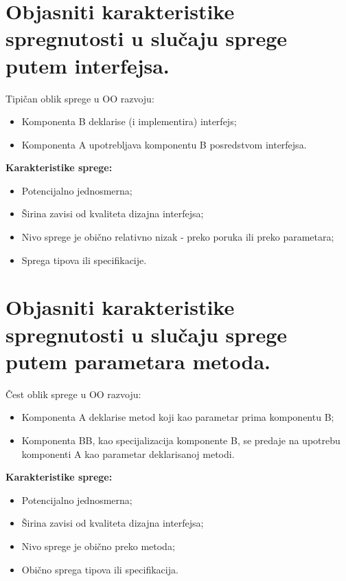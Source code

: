 \documentclass[a4paper]{article}
\begin{document}
\section{Objasniti karakteristike spregnutosti u slučaju sprege putem interfejsa.}
  \noindent Tipičan oblik sprege u OO razvoju:
  \begin{itemize}
    \item Komponenta B deklarise (i implementira) interfejs;
    \item Komponenta A upotrebljava komponentu B posredstvom interfejsa.
  \end{itemize}
  \textbf{Karakteristike sprege:}
  \begin{itemize}
    \item Potencijalno jednosmerna;
    \item Širina zavisi od kvaliteta dizajna interfejsa;
    \item Nivo sprege je obično relativno nizak - preko poruka ili preko parametara;
    \item Sprega tipova ili specifikacije.
  \end{itemize}

\section{Objasniti karakteristike spregnutosti u slučaju sprege putem parametara metoda.}
  \noindent Čest oblik sprege u OO razvoju:
  \begin{itemize}
    \item Komponenta A deklarise metod koji kao parametar prima komponentu B;
    \item Komponenta BB, kao specijalizacija komponente B, se predaje na upotrebu komponenti 
          A kao parametar deklarisanoj metodi.
  \end{itemize}
  \textbf{Karakteristike sprege:}
  \begin{itemize}
    \item Potencijalno jednosmerna;
    \item Širina zavisi od kvaliteta dizajna interfejsa;
    \item Nivo sprege je obično preko metoda;
    \item Obično sprega tipova ili specifikacija.
  \end{itemize}
\end{document}
